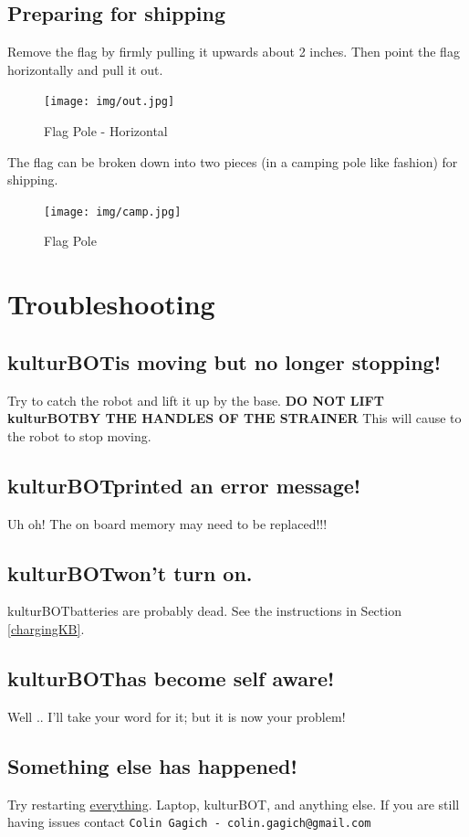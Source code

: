 \documentclass[]{article}
\newcommand{\kb}{kulturBOT}
\newcommand{\kbspace}{\kb \space}
\begin{document}
\subsection{Preparing for shipping}

Remove the flag by firmly pulling it upwards about 2 inches. Then point the flag horizontally and pull it out.\\ 

	\begin{figure}[h!]
		\centering
	    \texttt{[image: img/out.jpg]}
	    \caption{Flag Pole - Horizontal}
	\end{figure}
	
\newpage

The flag can be broken down into two pieces (in a camping pole like fashion) for shipping.

	\begin{figure}[h!]
		\centering
	    \texttt{[image: img/camp.jpg]}
	    \caption{Flag Pole}
	\end{figure}
\newpage
\section{Troubleshooting}
\subsection{\kbspace is moving but no longer stopping!}
Try to catch the robot and lift it up by the base. \textbf{DO NOT LIFT \kbspace BY THE HANDLES OF THE STRAINER} This will cause to the robot to stop moving.
\subsection{\kbspace printed an error message!}
Uh oh! The on board memory may need to be replaced!!!
\subsection{\kbspace won't turn on.}
\kbspace batteries are probably dead. See the instructions in Section \ref{chargingKB}.
\subsection{\kbspace has become self aware!}
Well .. I'll take your word for it; but it is now your problem!
\subsection{Something else has happened!}
Try restarting \underline{everything}. Laptop, \kb, and anything else. If you are still having issues contact \texttt{Colin Gagich - colin.gagich@gmail.com}
\end{document}
